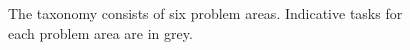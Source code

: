     
    \begin{figure}[h!]
        \begin{center}
            
            \caption{The \gai taxonomy consists of six \gai problem areas. Indicative tasks for each problem area are in grey.}
            \label{Figure:gai-taxonomy}
        \end{center}
    \end{figure}

